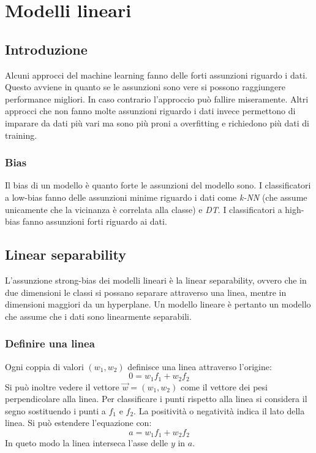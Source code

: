 \chapter{Modelli lineari}

\section{Introduzione}
Alcuni approcci del machine learning fanno delle forti assunzioni riguardo i dati.
Questo avviene in quanto se le assunzioni sono vere si possono raggiungere performance migliori.
In caso contrario l'approccio pu\`o fallire miseramente.
Altri approcci che non fanno molte assunzioni riguardo i dati invece permettono di imparare da dati pi\`u vari ma sono pi\`u proni a overfitting e richiedono pi\`u dati di training.

	\subsection{Bias}
	Il bias di un modello \`e quanto forte le assunzioni del modello sono.
	I classificatori a low-bias fanno delle assunzioni minime riguardo i dati come \emph{k-NN} (che assume unicamente che la vicinanza \`e correlata alla classe) e \emph{DT}.
	I classificatori a high-bias fanno assunzioni forti riguardo ai dati.

\section{Linear separability}
L'assunzione strong-bias dei modelli lineari \`e la linear separability, ovvero che in due dimensioni le classi si possano separare attraverso una linea, mentre in dimensioni maggiori da un hyperplane.
Un modello lineare \`e pertanto un modello che assume che i dati sono linearmente separabili.

	\subsection{Definire una linea}
	Ogni coppia di valori $(w_1,w_2)$ definisce una linea attraverso l'origine:
	$$0=w_1f_1+w_2f_2$$
	Si pu\`o inoltre vedere il vettore $\overrightarrow{w}=(w_1, w_2)$ come il vettore dei pesi perpendicolare alla linea.
	Per classificare i punti rispetto alla linea si considera il segno sostituendo i punti a $f_1$ e $f_2$.
	La positivit\`a o negativit\`a indica il lato della linea.
	Si pu\`o estendere l'equazione con:
	$$a=w_1f_1+w_2f_2$$
	In queto modo la linea interseca l'asse delle $y$ in $a$.

